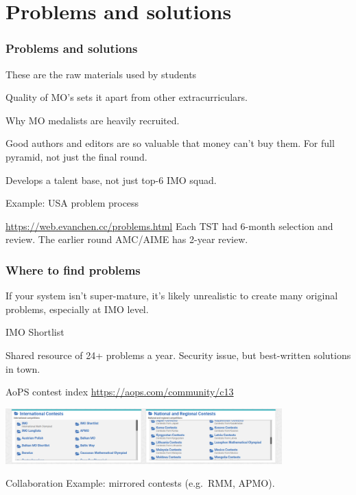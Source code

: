 \documentclass[10pt]{beamer}
\begin{document}
\section{Problems and solutions}
\begin{frame}
  \frametitle{Problems and solutions}
  \begin{block}{These are the raw materials used by students}
    \begin{itemize}
      \ii Quality of MO's sets it apart from other extracurriculars.
      \begin{itemize}
        \ii Why MO medalists are heavily recruited.
      \end{itemize}
      \ii Good authors and editors are so valuable that money can't buy them.
      \ii For full pyramid, not just the final round.
      \begin{itemize}
        \ii Develops a talent base, not just top-6 IMO squad.
      \end{itemize}
    \end{itemize}
  \end{block}
  \pause
  \begin{exampleblock}{Example: USA problem process}
    \begin{itemize}
      \ii \url{https://web.evanchen.cc/problems.html}
      \ii Each TST had \alert{6-month selection and review}.
      \ii The earlier round AMC/AIME has \alert{2-year review}.
    \end{itemize}
  \end{exampleblock}
\end{frame}
\begin{frame}
  \frametitle{Where to find problems}
  If your system isn't super-mature, it's likely
  unrealistic to create many original problems, especially at IMO level.
  \pause
  \begin{alertblock}{IMO Shortlist}
    \begin{itemize}
      \ii Shared resource of 24+ problems a year.
      \ii Security issue, but best-written solutions in town.
    \end{itemize}
  \end{alertblock}
  \pause
  \begin{exampleblock}{AoPS contest index}
    \url{https://aops.com/community/c13}
    \begin{center}
      \includegraphics[width=0.8\textwidth]{contest-index.png}
    \end{center}
  \end{exampleblock}
  \pause
  \begin{block}{Collaboration}
    Example: mirrored contests (e.g.\ RMM, APMO).
  \end{block}
\end{frame}
\end{document}
